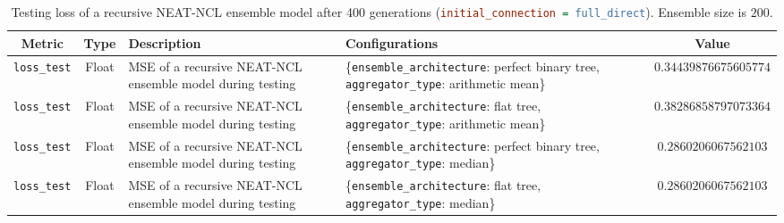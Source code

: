\begin{table}[H]
    \centering
    \begin{tabular}{|c|c|p{4cm}|p{5cm}|c|}
        \hline
        Metric & Type & Description & Configurations & Value \\
        \hline
        \small\texttt{loss\_test} & Float & MSE of a recursive NEAT-NCL ensemble model during testing & \{\texttt{ensemble\_architecture}: perfect binary tree, \texttt{aggregator\_type}: arithmetic mean\} & $0.34439876675605774$ \\
        \hline
        \small\texttt{loss\_test} & Float & MSE of a recursive NEAT-NCL ensemble model during testing & \{\texttt{ensemble\_architecture}: flat tree, \texttt{aggregator\_type}: arithmetic mean\} & $0.38286858797073364$ \\
        \hline
        \small\texttt{loss\_test} & Float & MSE of a recursive NEAT-NCL ensemble model during testing & \{\texttt{ensemble\_architecture}: perfect binary tree, \texttt{aggregator\_type}: median\} & $0.2860206067562103$ \\
        \hline
        \small\texttt{loss\_test} & Float & MSE of a recursive NEAT-NCL ensemble model during testing & \{\texttt{ensemble\_architecture}: flat tree, \texttt{aggregator\_type}: median\} & $0.2860206067562103$ \\
        \hline
    \end{tabular}
    \caption{Testing loss of a recursive NEAT-NCL ensemble model after 400 generations (\lstinline[language=ini]|initial_connection = full_direct|). Ensemble size is $200$. }
    \label{table:experiment_6_neat_ncl_full_direct}
\end{table}